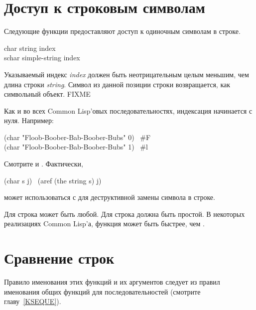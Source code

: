 \section{Доступ к строковым символам}

Следующие функции предоставляют доступ к одиночным символам в строке.

\begin{defun}[Функция]
char string index \\
schar simple-string index

Указываемый индекс \emph{index} должен быть неотрицательным целым меньшим, чем длина
строки \emph{string}. Символ из данной позиции строки возвращается, как символьный
объект. FIXME

Как и во всех Common Lisp'овых последовательностях, индексация начинается с
нуля.
Например:
\begin{lisp}
(char "Floob-Boober-Bab-Boober-Bubs" 0) \EV\ \#{\Xbackslash}F \\
(char "Floob-Boober-Bab-Boober-Bubs" 1) \EV\ \#{\Xbackslash}l
\end{lisp}
Смотрите  и . Фактически, 
\begin{lisp}
(char s j) \EQ\ (aref (the string s) j)
\end{lisp}
 может использоваться с  для деструктивной замены символа в
строке.

Для  строка может быть любой.
Для  строка должна быть простой.
В некоторых реализациях Common Lisp'а, функция  может быть быстрее,
чем .
\end{defun}

\section{Сравнение строк}

Правило именования этих функций и их аргументов следует из правил именования
общих функций для последовательностей (смотрите главу~\ref{KSEQUE}).

